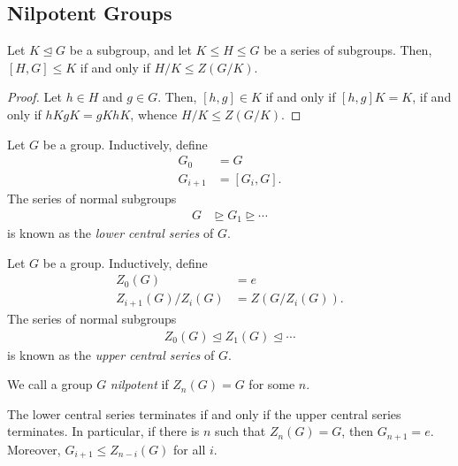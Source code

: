 \documentclass[10pt]{mypackage}
\begin{document}
\subsection{Nilpotent Groups}%
\begin{proposition}
  Let $K\trianglelefteq G$ be a subgroup, and let $K\leq H\leq G$ be a series of subgroups. Then, $\left[ H,G \right]\leq K$ if and only if $H/K\leq Z\left( G/K \right)$.
\end{proposition}
\begin{proof}
  Let $h\in H$ and $g\in G$. Then, $\left[ h,g \right]\in K$ if and only if $\left[ h,g \right]K = K$, if and only if $hKgK = gKhK$, whence $H/K\leq Z\left( G/K \right)$.
\end{proof}
\begin{definition}
  Let $G$ be a group. Inductively, define
  \begin{align*}
    G_0 &= G\\
    G_{i+1} &= \left[ G_i,G \right].
  \end{align*}
  The series of normal subgroups
  \begin{align*}
    G &\trianglerighteq G_1 \trianglerighteq \cdots
  \end{align*}
  is known as the \textit{lower central series} of $G$.
\end{definition}
\begin{definition}
  Let $G$ be a group. Inductively, define
  \begin{align*}
    Z_0(G) &= e\\
    Z_{i+1}(G)/Z_i(G) &= Z\left( G/Z_i(G) \right).
  \end{align*}
  The series of normal subgroups
  \begin{align*}
    Z_0(G) \trianglelefteq Z_1(G) \trianglelefteq\cdots
  \end{align*}
  is known as the \textit{upper central series} of $G$.%

  We call a group $G$ \textit{nilpotent} if $Z_n(G) = G$ for some $n$.
\end{definition}
\begin{proposition}
  The lower central series terminates if and only if the upper central series terminates. In particular, if there is $n$ such that $Z_n(G) = G$, then $G_{n+1} = e$. Moreover, $G_{i+1}\leq Z_{n-i}(G)$ for all $i$.
\end{proposition}
\end{document}
